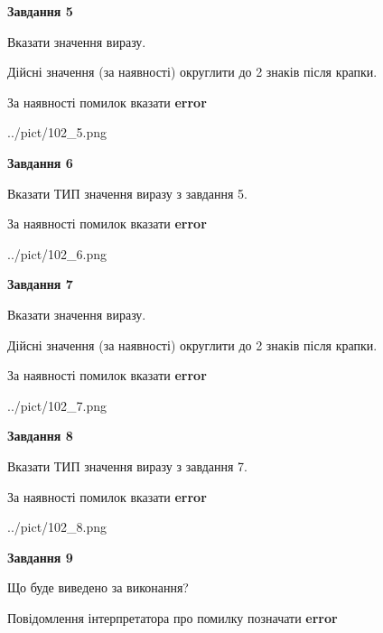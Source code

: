 \documentclass[11pt, ukrainian]{article}
\begin{document}
{\begin {large}
{\begin {center}\textbf{Завдання 5}\end {center}}\par
Вказати значення виразу. \par
Дійсні значення (за наявності) округлити до 2 знаків після крапки. \par
За наявності помилок вказати \textbf{error}

\begin{center}
	{../pict/102_5.png}
\end{center}
\newpage

{\begin {center}\textbf{Завдання 6}\end {center}}\par
Вказати ТИП значення виразу з завдання 5. \par
За наявності помилок вказати \textbf{error}

\begin{center}
	{../pict/102_6.png}
\end{center}
\newpage

{\begin {center}\textbf{Завдання 7}\end {center}}\par
Вказати значення виразу. \par
Дійсні значення (за наявності) округлити до 2 знаків після крапки. \par
За наявності помилок вказати \textbf{error}

\begin{center}
	{../pict/102_7.png}
\end{center}
\newpage

{\begin {center}\textbf{Завдання 8}\end {center}}\par
Вказати ТИП значення виразу з завдання 7. \par
За наявності помилок вказати \textbf{error}

\begin{center}
	{../pict/102_8.png}
\end{center}
\newpage

{\begin {center}\textbf{Завдання 9}\end {center}}\par
Що буде виведено за виконання? \par
Повідомлення інтерпретатора про помилку позначати \textbf{error}


\end{large}}
\end{document}
